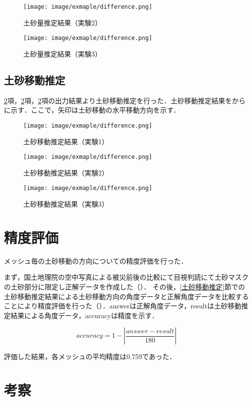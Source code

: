       \begin{figure}[t]
        \centering
        \texttt{[image: image/exmaple/difference.png]}
        \caption{土砂量推定結果（実験2）}
      \end{figure}

      \begin{figure}[t]
        \centering
        \texttt{[image: image/exmaple/difference.png]}
        \caption{土砂量推定結果（実験3）}
        \label{土砂量推定結果（実験3）}
      \end{figure}


    \subsection{土砂移動推定}
      \ref{}項，\ref{}項，\ref{}項の出力結果より土砂移動推定を行った．土砂移動推定結果をからに示す．ここで，矢印は土砂移動の水平移動方向を示す．

      \begin{figure}[t]
        \centering
        \texttt{[image: image/exmaple/difference.png]}
        \caption{土砂移動推定結果（実験1）}
        \label{土砂移動推定結果（実験1）}
      \end{figure}

      \begin{figure}[t]
        \centering
        \texttt{[image: image/exmaple/difference.png]}
        \caption{土砂移動推定結果（実験2）}
      \end{figure}

      \begin{figure}[t]
        \centering
        \texttt{[image: image/exmaple/difference.png]}
        \caption{土砂移動推定結果（実験3）}
        \label{土砂移動推定結果（実験3）}
      \end{figure}



  \section{精度評価}
    メッシュ毎の土砂移動の方向についての精度評価を行った．

    まず，国土地理院の空中写真による被災前後の比較\cite{国土地理院空撮画像1, 国土地理院空撮画像2}にて目視判読にて土砂マスクの土砂部分に限定し正解データを作成した（\fref{}）． その後，\ref{土砂移動推定}節での土砂移動推定結果による土砂移動方向の角度データと正解角度データを比較することにより精度評価を行った（）．answerは正解角度データ，resultは土砂移動推定結果による角度データ，accuracyは精度を示す．
    
    \begin{equation}
      \label{精度評価}
      accuracy = 1 - |\dfrac{answer - result} {180}|
    \end{equation}

    評価した結果，各メッシュの平均精度は0.759であった．


    
  \section{考察}
